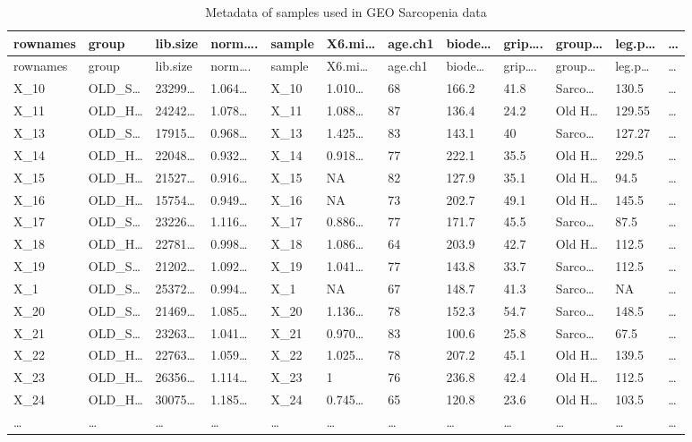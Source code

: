 \documentclass[
]{article}
\begin{document}
\begin{longtable}[]{@{}llllllllllll@{}}
\caption{\label{tab:metadata-of-samples-used-in-GEO-Sarcopenia-data}Metadata of samples used in GEO Sarcopenia data}\tabularnewline
\toprule
rownames & group & lib.size & norm\ldots. & sample & X6.mi\ldots{} & age.ch1 & biode\ldots{} & grip\ldots. & group\ldots{} & leg.p\ldots{} & \ldots{}\tabularnewline
\midrule
\endfirsthead
\toprule
rownames & group & lib.size & norm\ldots. & sample & X6.mi\ldots{} & age.ch1 & biode\ldots{} & grip\ldots. & group\ldots{} & leg.p\ldots{} & \ldots{}\tabularnewline
\midrule
\endhead
X\_10 & OLD\_S\ldots{} & 23299\ldots{} & 1.064\ldots{} & X\_10 & 1.010\ldots{} & 68 & 166.2 & 41.8 & Sarco\ldots{} & 130.5 & \ldots{}\tabularnewline
X\_11 & OLD\_H\ldots{} & 24242\ldots{} & 1.078\ldots{} & X\_11 & 1.088\ldots{} & 87 & 136.4 & 24.2 & Old H\ldots{} & 129.55 & \ldots{}\tabularnewline
X\_13 & OLD\_S\ldots{} & 17915\ldots{} & 0.968\ldots{} & X\_13 & 1.425\ldots{} & 83 & 143.1 & 40 & Sarco\ldots{} & 127.27 & \ldots{}\tabularnewline
X\_14 & OLD\_H\ldots{} & 22048\ldots{} & 0.932\ldots{} & X\_14 & 0.918\ldots{} & 77 & 222.1 & 35.5 & Old H\ldots{} & 229.5 & \ldots{}\tabularnewline
X\_15 & OLD\_H\ldots{} & 21527\ldots{} & 0.916\ldots{} & X\_15 & NA & 82 & 127.9 & 35.1 & Old H\ldots{} & 94.5 & \ldots{}\tabularnewline
X\_16 & OLD\_H\ldots{} & 15754\ldots{} & 0.949\ldots{} & X\_16 & NA & 73 & 202.7 & 49.1 & Old H\ldots{} & 145.5 & \ldots{}\tabularnewline
X\_17 & OLD\_S\ldots{} & 23226\ldots{} & 1.116\ldots{} & X\_17 & 0.886\ldots{} & 77 & 171.7 & 45.5 & Sarco\ldots{} & 87.5 & \ldots{}\tabularnewline
X\_18 & OLD\_H\ldots{} & 22781\ldots{} & 0.998\ldots{} & X\_18 & 1.086\ldots{} & 64 & 203.9 & 42.7 & Old H\ldots{} & 112.5 & \ldots{}\tabularnewline
X\_19 & OLD\_S\ldots{} & 21202\ldots{} & 1.092\ldots{} & X\_19 & 1.041\ldots{} & 77 & 143.8 & 33.7 & Sarco\ldots{} & 112.5 & \ldots{}\tabularnewline
X\_1 & OLD\_S\ldots{} & 25372\ldots{} & 0.994\ldots{} & X\_1 & NA & 67 & 148.7 & 41.3 & Sarco\ldots{} & NA & \ldots{}\tabularnewline
X\_20 & OLD\_S\ldots{} & 21469\ldots{} & 1.085\ldots{} & X\_20 & 1.136\ldots{} & 78 & 152.3 & 54.7 & Sarco\ldots{} & 148.5 & \ldots{}\tabularnewline
X\_21 & OLD\_S\ldots{} & 23263\ldots{} & 1.041\ldots{} & X\_21 & 0.970\ldots{} & 83 & 100.6 & 25.8 & Sarco\ldots{} & 67.5 & \ldots{}\tabularnewline
X\_22 & OLD\_H\ldots{} & 22763\ldots{} & 1.059\ldots{} & X\_22 & 1.025\ldots{} & 78 & 207.2 & 45.1 & Old H\ldots{} & 139.5 & \ldots{}\tabularnewline
X\_23 & OLD\_H\ldots{} & 26356\ldots{} & 1.114\ldots{} & X\_23 & 1 & 76 & 236.8 & 42.4 & Old H\ldots{} & 112.5 & \ldots{}\tabularnewline
X\_24 & OLD\_H\ldots{} & 30075\ldots{} & 1.185\ldots{} & X\_24 & 0.745\ldots{} & 65 & 120.8 & 23.6 & Old H\ldots{} & 103.5 & \ldots{}\tabularnewline
\ldots{} & \ldots{} & \ldots{} & \ldots{} & \ldots{} & \ldots{} & \ldots{} & \ldots{} & \ldots{} & \ldots{} & \ldots{} & \ldots{}\tabularnewline
\bottomrule
\end{longtable}
\end{document}
